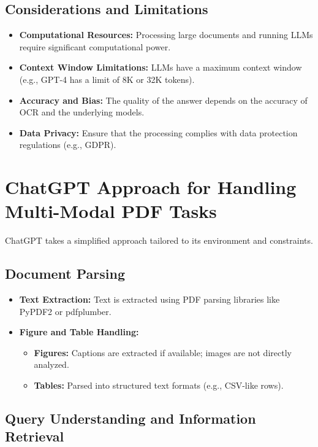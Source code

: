 \documentclass[12pt]{article}
\begin{document}
\subsection{Considerations and Limitations}

\begin{itemize}
    \item \textbf{Computational Resources:} Processing large documents and running LLMs require significant computational power.
    \item \textbf{Context Window Limitations:} LLMs have a maximum context window (e.g., GPT-4 has a limit of 8K or 32K tokens).
    \item \textbf{Accuracy and Bias:} The quality of the answer depends on the accuracy of OCR and the underlying models.
    \item \textbf{Data Privacy:} Ensure that the processing complies with data protection regulations (e.g., GDPR).
\end{itemize}

\section{ChatGPT Approach for Handling Multi-Modal PDF Tasks}

ChatGPT takes a simplified approach tailored to its environment and constraints.

\subsection{Document Parsing}

\begin{itemize}
    \item \textbf{Text Extraction:} Text is extracted using PDF parsing libraries like PyPDF2 or pdfplumber.
    \item \textbf{Figure and Table Handling:}
    \begin{itemize}
        \item \textbf{Figures:} Captions are extracted if available; images are not directly analyzed.
        \item \textbf{Tables:} Parsed into structured text formats (e.g., CSV-like rows).
    \end{itemize}
\end{itemize}

\subsection{Query Understanding and Information Retrieval}
\end{document}
